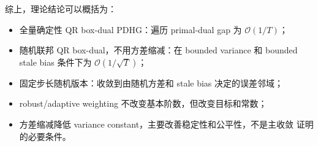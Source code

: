 \documentclass[UTF8,a4paper,11pt]{ctexart}
\begin{document}
综上，理论结论可以概括为：
\begin{itemize}[leftmargin=2em]
    \item 全量确定性 QR box-dual PDHG：遍历 primal-dual gap 为
    $\mathcal{O}(1/T)$；
    \item 随机联邦 QR box-dual，不用方差缩减：在 bounded variance 和 bounded
    stale bias 条件下为 $\mathcal{O}(1/\sqrt{T})$；
    \item 固定步长随机版本：收敛到由随机方差和 stale bias 决定的误差邻域；
    \item robust/adaptive weighting 不改变基本阶数，但改变目标和常数；
    \item 方差缩减降低 variance constant，主要改善稳定性和公平性，不是主收敛
    证明的必要条件。
\end{itemize}
\end{document}
